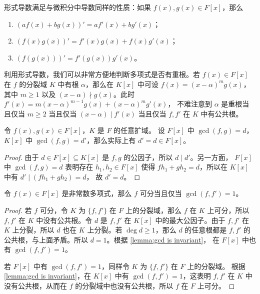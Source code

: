 形式导数满足与微积分中导数同样的性质：如果 $f(x),g(x)\in F[x]$，那么
\begin{enumerate}
  \item $(af(x)+bg(x))'=af'(x)+bg'(x)$；
  \item $(f(x)g(x))'=f'(x)g(x)+f(x)g'(x)$；
  \item $(f(g(x)))'=f'(g(x))g'(x)$。
\end{enumerate}
利用形式导数，我们可以非常方便地判断多项式是否有重根。若 $f(x)\in F[x]$
在 $f$ 的分裂域 $K$ 中有根 $\alpha$，那么在 $K[x]$ 中可设 $f(x)=(x-\alpha)^mg(x)$，
其中 $m\geq 1$ 以及 $(x-\alpha)\nmid g(x)$。此时 $f'(x)=m(x-\alpha)^{m-1}g(x)+(x-\alpha)^mg'(x)$，
不难注意到 $\alpha$ 是重根当且仅当 $m\geq 2$ 当且仅当 $(x-\alpha)\mid f'(x)$
当且仅当 $f,f'$ 在 $K$ 中有公共根。

\begin{lemma}\label{lemma:gcd is invariant}
  令 $f(x),g(x)\in F[x]$，$K$ 是 $F$ 的任意扩域。
  设 $F[x]$ 中 $\gcd(f,g)=d$， $K[x]$ 中 $\gcd(f,g)=d'$，那么实际上有
  $d'=d\in F[x]$。
\end{lemma}
\begin{proof}
  由于 $d\in F[x]\subseteq K[x]$
  是 $f,g$ 的公因子，所以 $d\mid d'$。另一方面，
  $F[x]$ 中 $\gcd(f,g)=d$ 表明存在 $h_1,h_2\in F[x]$
  使得 $fh_1+gh_2=d$，所以在 $K[x]$ 中有 $d'\mid (fh_1+gh_2)=d$，
  故 $d'=d$。
\end{proof}

\begin{proposition}\label{prop:separable polynomial test}
  令 $f(x)\in F[x]$ 是非常数多项式，那么 $f$ 可分当且仅当
  $\gcd(f,f')=1$。
\end{proposition}
\begin{proof}
  若 $f$ 可分，令 $K$ 为 $\{f,f'\}$ 在 $F$ 上的分裂域，那么 $f$
  在 $K$ 上可分，所以 $f,f'$ 在 $K$ 中没有公共根。令 $d$
  是 $f,f'$ 在 $K[x]$ 中的最大公因子。由于 $f,f'$ 在 $K$ 上分裂，所以
  $d$ 也在 $K$ 上分裂。若 $\deg d\geq 1$，那么 $d$ 的任意根都是
  $f,f'$ 的公共根，与上面矛盾。所以 $d=1$。根据 \autoref{lemma:gcd is invariant}，
  在 $F[x]$ 中也有 $\gcd(f,f')=1$。

  若 $F[x]$ 中有 $\gcd(f,f')=1$，同样令 $K$ 为 $\{f,f'\}$ 在 $F$ 上的分裂域。
  根据 \autoref{lemma:gcd is invariant}，在 $K[x]$ 中有
  $\gcd(f,f')=1$，这表明 $f,f'$ 在 $K$ 中没有公共根，从而在
  $f$ 的分裂域中也没有公共根，所以 $f$ 在 $F$ 上可分。
\end{proof}

